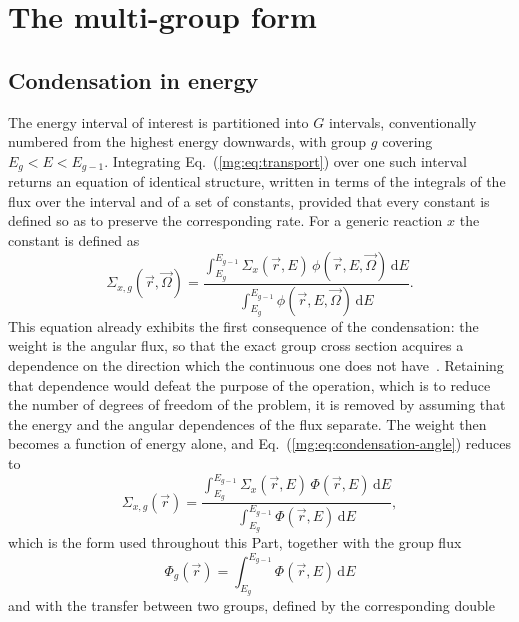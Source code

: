 \section{The multi-group form}\label{mg:sec:multigroup}

\subsection{Condensation in energy}

The energy interval of interest is partitioned into $G$ intervals, conventionally
numbered from the highest energy downwards, with group $g$ covering
$E_{g}<E<E_{g-1}$. Integrating Eq.~(\ref{mg:eq:transport}) over one such interval
returns an equation of identical structure, written in terms of the integrals of
the flux over the interval and of a set of constants, provided that every
constant is defined so as to preserve the corresponding rate. For a generic
reaction $x$ the constant is defined as
%
\begin{equation}
  \Sigma_{x,g}(\vec{r},\vec{\Omega}) =
  \frac{\displaystyle\int_{E_g}^{E_{g-1}}\Sigma_x(\vec{r},E)\,
        \phi(\vec{r},E,\vec{\Omega})\,\mathrm{d}E}
       {\displaystyle\int_{E_g}^{E_{g-1}}\phi(\vec{r},E,\vec{\Omega})\,\mathrm{d}E} .
  \label{mg:eq:condensation-angle}
\end{equation}
%
This equation already exhibits the first consequence of the condensation: the
weight is the angular flux, so that the exact group cross section acquires a
dependence on the direction which the continuous one does not
have~\cite{SPH_book_Bell_Glasstone}.
Retaining that dependence would defeat the purpose of the operation, which is to
reduce the number of degrees of freedom of the problem, it is removed by
assuming that the energy and the angular dependences of the flux
separate. The weight then becomes a function of energy alone, and
Eq.~(\ref{mg:eq:condensation-angle}) reduces to
%
\begin{equation}
  \Sigma_{x,g}(\vec{r}) =
  \frac{\displaystyle\int_{E_g}^{E_{g-1}}\Sigma_x(\vec{r},E)\,\Phi(\vec{r},E)\,\mathrm{d}E}
       {\displaystyle\int_{E_g}^{E_{g-1}}\Phi(\vec{r},E)\,\mathrm{d}E} ,
  \label{mg:eq:condensation}
\end{equation}
%
which is the form used throughout this Part, together with the group flux
%
\begin{equation}
  \Phi_g(\vec{r}) = \int_{E_g}^{E_{g-1}}\Phi(\vec{r},E)\,\mathrm{d}E
  \label{mg:eq:groupflux}
\end{equation}
%
and with the transfer between two groups, defined by the corresponding double
